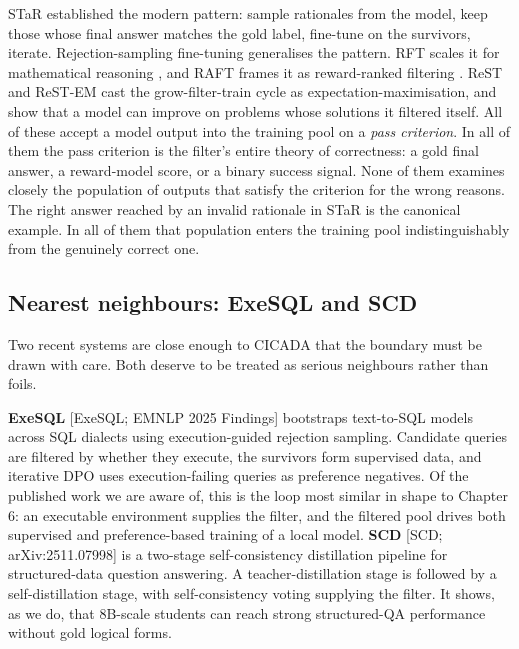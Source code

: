STaR \citep{zelikman2022star} established the modern pattern: sample rationales from the model, keep those whose final answer matches the gold label, fine-tune on the survivors, iterate. Rejection-sampling fine-tuning generalises the pattern. RFT scales it for mathematical reasoning \citep{yuan2023rft}, and RAFT frames it as reward-ranked filtering \citep{dong2023raft}. ReST \citep{gulcehre2023rest} and ReST-EM \citep{singh2024restem} cast the grow-filter-train cycle as expectation-maximisation, and show that a model can improve on problems whose solutions it filtered itself. All of these accept a model output into the training pool on a \emph{pass criterion}. In all of them the pass criterion is the filter's entire theory of correctness: a gold final answer, a reward-model score, or a binary success signal. None of them examines closely the population of outputs that satisfy the criterion for the wrong reasons. The right answer reached by an invalid rationale in STaR is the canonical example. In all of them that population enters the training pool indistinguishably from the genuinely correct one.

\subsection{Nearest neighbours: ExeSQL and SCD}\label{sec:nearest-neighbours-exesql-and-scd}

Two recent systems are close enough to CICADA that the boundary must be drawn with care. Both deserve to be treated as serious neighbours rather than foils.

\textbf{ExeSQL} [ExeSQL; EMNLP 2025 Findings] bootstraps text-to-SQL models across SQL dialects using execution-guided rejection sampling. Candidate queries are filtered by whether they execute, the survivors form supervised data, and iterative DPO uses execution-failing queries as preference negatives. Of the published work we are aware of, this is the loop most similar in shape to Chapter 6: an executable environment supplies the filter, and the filtered pool drives both supervised and preference-based training of a local model. \textbf{SCD} [SCD; arXiv:2511.07998] is a two-stage self-consistency distillation pipeline for structured-data question answering. A teacher-distillation stage is followed by a self-distillation stage, with self-consistency voting supplying the filter. It shows, as we do, that 8B-scale students can reach strong structured-QA performance without gold logical forms.

